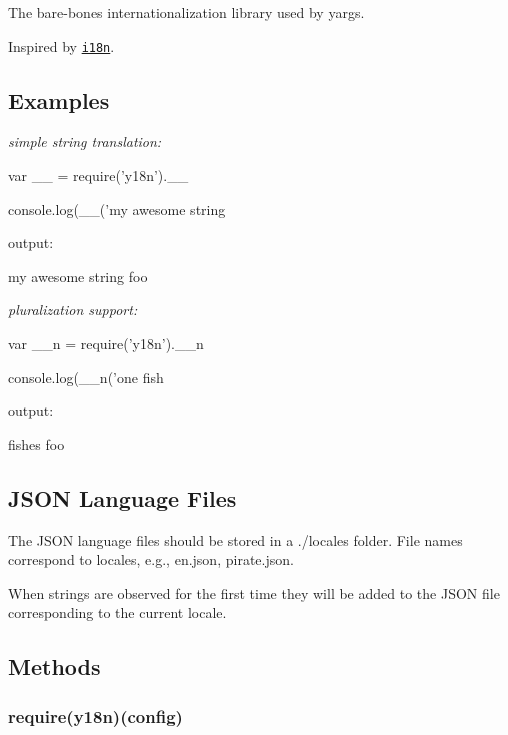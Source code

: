 \href{https://travis-ci.org/yargs/y18n}{\tt } \href{https://coveralls.io/github/yargs/y18n}{\tt } \href{https://npmjs.org/package/y18n}{\tt } \href{https://github.com/feross/standard}{\tt }

The bare-\/bones internationalization library used by yargs.

Inspired by \href{https://www.npmjs.com/package/i18n}{\tt i18n}.

\subsection*{Examples}

{\itshape simple string translation\+:}


\begin{DoxyCode}
var \_\_ = require('y18n').\_\_

console.log(\_\_('my awesome string %
\end{DoxyCode}


output\+:

{\ttfamily my awesome string foo}

{\itshape pluralization support\+:}


\begin{DoxyCode}
var \_\_n = require('y18n').\_\_n

console.log(\_\_n('one fish %
\end{DoxyCode}


output\+:

{ fishes foo}

\subsection*{J\+S\+ON Language Files}

The J\+S\+ON language files should be stored in a {\ttfamily ./locales} folder. File names correspond to locales, e.\+g., {\ttfamily en.\+json}, {\ttfamily pirate.\+json}.

When strings are observed for the first time they will be added to the J\+S\+ON file corresponding to the current locale.

\subsection*{Methods}

\subsubsection*{require(\textquotesingle{}y18n\textquotesingle{})(config)}

